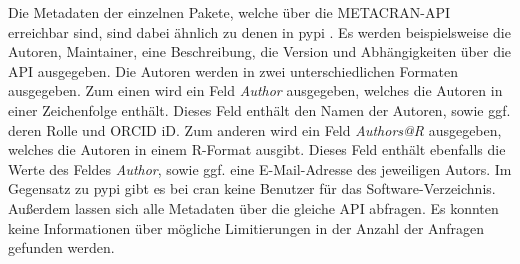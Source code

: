 Die Metadaten der einzelnen Pakete, welche über die METACRAN-API erreichbar sind, sind dabei ähnlich zu denen in \gls{pypi} \autocite{csardi_pkgsearch_2023}.
Es werden beispielsweise die Autoren, Maintainer, eine Beschreibung, die Version und Abhängigkeiten über die API ausgegeben.
Die Autoren werden in zwei unterschiedlichen Formaten ausgegeben.
Zum einen wird ein Feld \emph{Author} ausgegeben, welches die Autoren in einer Zeichenfolge enthält.
Dieses Feld enthält den Namen der Autoren, sowie ggf. deren Rolle und ORCID iD.
Zum anderen wird ein Feld \emph{Authors@R} ausgegeben, welches die Autoren in einem R-Format ausgibt.
Dieses Feld enthält ebenfalls die Werte des Feldes \emph{Author}, sowie ggf. eine E-Mail-Adresse des jeweiligen Autors. 
Im Gegensatz zu \gls{pypi} gibt es bei \gls{cran} keine Benutzer für das Software-Verzeichnis.
Außerdem lassen sich alle Metadaten über die gleiche API abfragen.
Es konnten keine Informationen über mögliche Limitierungen in der Anzahl der Anfragen gefunden werden.
